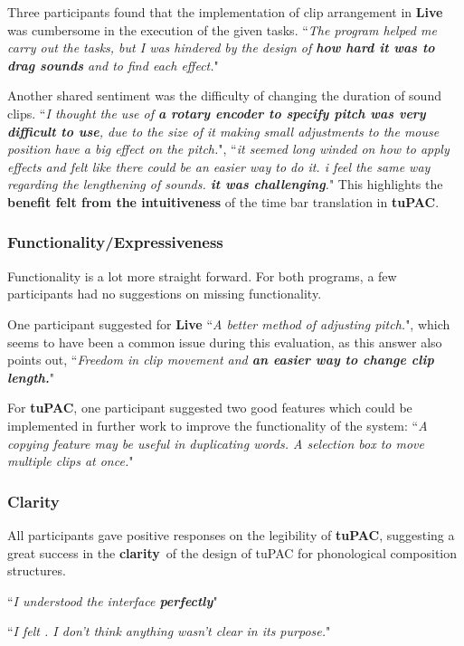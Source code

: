 \documentclass[12pt,a4paper,oneside,openright]{report}
\newcommand{\clarity}{\textbf{clarity}}
\newcommand{\quoteT}[1]{``\textit{#1}"}
\begin{document}
Three participants found that the implementation of clip arrangement in \textbf{Live} was cumbersome in the execution of the given tasks. \quoteT{The program helped me carry out the tasks, but I was hindered by the design of \textbf{how hard it was to drag sounds} and to find each effect.}

Another shared sentiment was the difficulty of changing the duration of sound clips. \quoteT{I thought the use of \textbf{a rotary encoder to specify pitch was very difficult to use}, due to the size of it making small adjustments to the mouse position have a big effect on the pitch.}, \quoteT{it seemed long winded on how to apply effects and felt like there could be an easier way to do it. i feel the same way regarding the lengthening of sounds. \textbf{it was challenging}.} This highlights the \textbf{benefit felt from the intuitiveness} of the time bar translation in \textbf{tuPAC}.

\subsubsection{Functionality/Expressiveness}\label{sec:qual_funct}
Functionality is a lot more straight forward. For both programs, a few participants had no suggestions on missing functionality.

One participant suggested for \textbf{Live} \quoteT{A better method of adjusting pitch.}, which seems to have been a common issue during this evaluation, as this answer also points out, \quoteT{Freedom in clip movement and \textbf{an easier way to change clip length.}}

For \textbf{tuPAC}, one participant suggested two good features which could be implemented in further work to improve the functionality of the system: \quoteT{A copying feature may be useful in duplicating words. A selection box to move multiple clips at once.}

\subsubsection{Clarity}
All participants gave positive responses on the legibility of \textbf{tuPAC}, suggesting a great success in the \clarity\ of the design of tuPAC for phonological composition structures.


\quoteT{I understood the interface \textbf{perfectly}}

\quoteT{I felt . I don’t think anything wasn’t clear in its purpose.}
\end{document}
